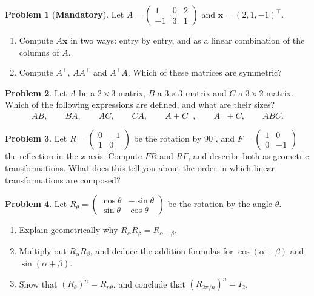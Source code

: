\documentclass[11pt]{article}
\theoremstyle{definition}
\newtheorem{problem}{Problem}[section]
\newcommand{\mandatory}{\textcolor{red!70!black}{\textbf{Mandatory}}}
\begin{document}
\begin{problem}[\mandatory]\label{pr:matvec}
    Let $A = \begin{pmatrix} 1 & 0 & 2 \\ -1 & 3 & 1 \end{pmatrix}$ and $\mathbf{x} = (2, 1, -1)^\top$.
    \begin{enumerate}[label=(\alph*)]
        \item Compute $A\mathbf{x}$ in two ways: entry by entry, and as a linear combination of the columns of $A$.
        \item Compute $A^\top$, $AA^\top$ and $A^\top A$. Which of these matrices are symmetric?
    \end{enumerate}
\end{problem}

\begin{problem}\label{pr:sizes}
    Let $A$ be a $2 \times 3$ matrix, $B$ a $3 \times 3$ matrix and $C$ a $3 \times 2$ matrix. Which of the following expressions are defined, and what are their sizes?
    \[AB, \qquad BA, \qquad AC, \qquad CA, \qquad A + C^\top, \qquad A^\top + C, \qquad ABC.\]
\end{problem}

\begin{problem}\label{pr:reflect-rotate}
    Let $R = \begin{pmatrix} 0 & -1 \\ 1 & 0 \end{pmatrix}$ be the rotation by $90^\circ$, and $F = \begin{pmatrix} 1 & 0 \\ 0 & -1 \end{pmatrix}$ the reflection in the $x$-axis. Compute $FR$ and $RF$, and describe both as geometric transformations. What does this tell you about the order in which linear transformations are composed?
\end{problem}

\begin{problem}\label{pr:rotation-addition}
    Let $R_\theta = \begin{pmatrix} \cos\theta & -\sin\theta \\ \sin\theta & \cos\theta \end{pmatrix}$ be the rotation by the angle $\theta$.
    \begin{enumerate}[label=(\alph*)]
        \item Explain geometrically why $R_\alpha R_\beta = R_{\alpha + \beta}$.
        \item Multiply out $R_\alpha R_\beta$, and deduce the addition formulas for $\cos(\alpha + \beta)$ and $\sin(\alpha + \beta)$.
        \item Show that $(R_\theta)^n = R_{n\theta}$, and conclude that $(R_{2\pi/n})^n = I_2$.
    \end{enumerate}
\end{problem}
\end{document}
